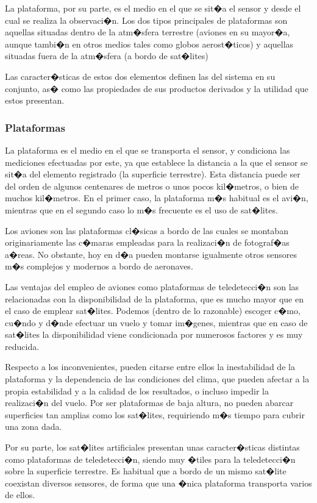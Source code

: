 La plataforma, por su parte, es el medio en el que se sit�a el sensor y desde el cual se realiza la observaci�n. Los dos tipos principales de plataformas son aquellas situadas dentro de la atm�sfera terrestre (aviones en su mayor�a, aunque tambi�n en otros medios tales como globos aerost�ticos) y aquellas situadas fuera de la atm�sfera (a bordo de sat�lites)

Las caracter�sticas de estos dos elementos definen las del sistema en su conjunto, as� como las propiedades de sus productos derivados y la utilidad que estos presentan.

\subsubsection{Plataformas}

La plataforma es el medio en el que se transporta el sensor, y condiciona las mediciones efectuadas por este, ya que establece la distancia a la que el sensor se sit�a del elemento registrado (la superficie terrestre). Esta distancia puede ser del orden de algunos centenares de metros o unos pocos kil�metros, o bien de muchos kil�metros. En el primer caso, la plataforma m�s habitual es el avi�n, mientras que en el segundo caso lo m�s frecuente es el uso de sat�lites.

Los aviones son las plataformas cl�sicas a bordo de las cuales se montaban originariamente las c�maras empleadas para la realizaci�n de fotograf�as a�reas. No obstante, hoy en d�a pueden montarse igualmente otros sensores m�s complejos y modernos a bordo de aeronaves. 

Las ventajas del empleo de aviones como plataformas de teledetecci�n son las relacionadas con la disponibilidad de la plataforma, que es mucho mayor que en el caso de emplear sat�lites. Podemos (dentro de lo razonable) escoger c�mo, cu�ndo y d�nde efectuar un vuelo y tomar im�genes, mientras que en caso de sat�lites la disponibilidad viene condicionada por numerosos factores y es muy reducida.

Respecto a los inconvenientes, pueden citarse entre ellos la inestabilidad de la plataforma y la dependencia de las condiciones del clima, que pueden afectar a la propia estabilidad y a la calidad de los resultados, o incluso impedir la realizaci�n del vuelo. Por ser plataformas de baja altura, no pueden abarcar superficies tan amplias como los sat�lites, requiriendo m�s tiempo para cubrir una zona dada.

Por su parte, los sat�lites artificiales presentan unas caracter�sticas distintas como plataformas de teledetecci�n, siendo muy �tiles para la teledetecci�n sobre la superficie terrestre. Es habitual que a bordo de un mismo sat�lite coexistan diversos sensores, de forma que una �nica plataforma transporta varios de ellos.

